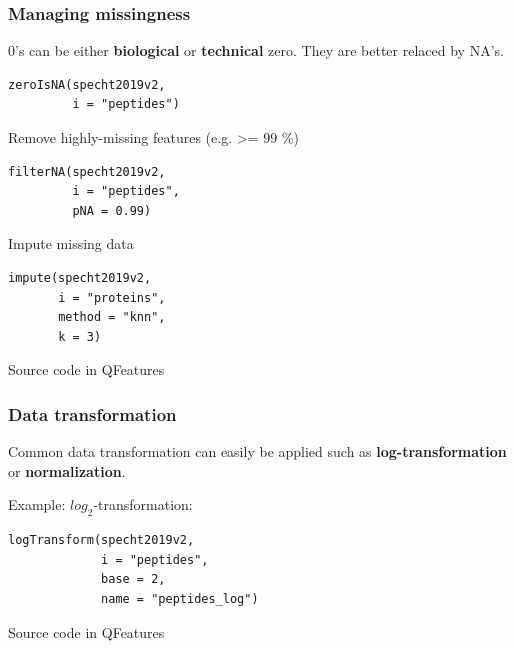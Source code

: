 \documentclass{beamer}
\newcommand{\hcode}[2][lgray]{{\ttfamily\color{vdgray}\colorbox{#1}{#2}}}
\newcommand{\frametitlesection}[1]{\frametitle{\centering #1 \footnotesize \hspace{0pt plus 1 filll} \insertsection}}
\begin{document}
\begin{frame}[fragile]
    \frametitlesection{Managing missingness}

    \hcode{0}'s can be either \textbf{biological} or \textbf{technical} zero.
    They are better relaced by \hcode{NA}'s.

    \begin{lstlisting}
zeroIsNA(specht2019v2,
         i = "peptides")
    \end{lstlisting}

    Remove highly-missing features (e.g. >= 99 \%)

    \begin{lstlisting}
filterNA(specht2019v2,
         i = "peptides",
         pNA = 0.99)
    \end{lstlisting}

    Impute missing data

    \begin{lstlisting}
impute(specht2019v2,
       i = "proteins",
       method = "knn",
       k = 3)
    \end{lstlisting}



    Source code in \hcode{QFeatures}

\end{frame}

\begin{frame}[fragile]
    \frametitlesection{Data transformation}

    Common data transformation can easily be applied such as \textbf{log-transformation}
    or \textbf{normalization}.

    \bigskip


    Example: $log_2$-transformation:

    \begin{lstlisting}
logTransform(specht2019v2,
             i = "peptides",
             base = 2,
             name = "peptides_log")
    \end{lstlisting}

    Source code in \hcode{QFeatures}

\end{frame}
\end{document}
